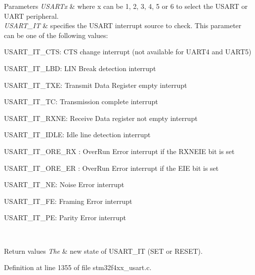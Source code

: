 \begin{DoxyParams}{Parameters}
{\em U\+S\+A\+R\+Tx} & where x can be 1, 2, 3, 4, 5 or 6 to select the U\+S\+A\+RT or U\+A\+RT peripheral. \\
\hline
{\em U\+S\+A\+R\+T\+\_\+\+IT} & specifies the U\+S\+A\+RT interrupt source to check. This parameter can be one of the following values\+: \begin{DoxyItemize}
\item U\+S\+A\+R\+T\+\_\+\+I\+T\+\_\+\+C\+TS\+: C\+TS change interrupt (not available for U\+A\+R\+T4 and U\+A\+R\+T5) \item U\+S\+A\+R\+T\+\_\+\+I\+T\+\_\+\+L\+BD\+: L\+IN Break detection interrupt \item U\+S\+A\+R\+T\+\_\+\+I\+T\+\_\+\+T\+XE\+: Transmit Data Register empty interrupt \item U\+S\+A\+R\+T\+\_\+\+I\+T\+\_\+\+TC\+: Transmission complete interrupt \item U\+S\+A\+R\+T\+\_\+\+I\+T\+\_\+\+R\+X\+NE\+: Receive Data register not empty interrupt \item U\+S\+A\+R\+T\+\_\+\+I\+T\+\_\+\+I\+D\+LE\+: Idle line detection interrupt \item U\+S\+A\+R\+T\+\_\+\+I\+T\+\_\+\+O\+R\+E\+\_\+\+RX \+: Over\+Run Error interrupt if the R\+X\+N\+E\+IE bit is set \item U\+S\+A\+R\+T\+\_\+\+I\+T\+\_\+\+O\+R\+E\+\_\+\+ER \+: Over\+Run Error interrupt if the E\+IE bit is set \item U\+S\+A\+R\+T\+\_\+\+I\+T\+\_\+\+NE\+: Noise Error interrupt \item U\+S\+A\+R\+T\+\_\+\+I\+T\+\_\+\+FE\+: Framing Error interrupt \item U\+S\+A\+R\+T\+\_\+\+I\+T\+\_\+\+PE\+: Parity Error interrupt \end{DoxyItemize}
\\
\hline
\end{DoxyParams}

\begin{DoxyRetVals}{Return values}
{\em The} & new state of U\+S\+A\+R\+T\+\_\+\+IT (S\+ET or R\+E\+S\+ET). \\
\hline
\end{DoxyRetVals}


Definition at line 1355 of file stm32f4xx\+\_\+usart.\+c.

\mbox{\label{group___u_s_a_r_t_gaaa23b05fe0e1896bad90da7f82750831}} 
